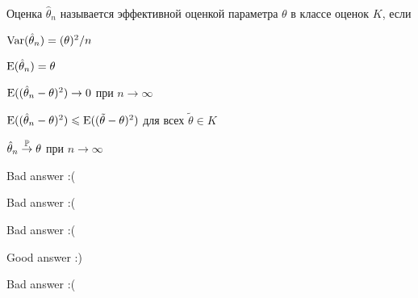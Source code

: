 
\begin{question}
Оценка \(\hat \theta_n\) называется эффективной оценкой параметра
\(\theta\) в классе оценок \(K\), если
\begin{answerlist}
  \item \(\Var(\hat \theta_n)=(\theta)^2/n\)
  \item \(\E(\hat \theta_n)=\theta\)
  \item \(\E((\hat \theta_n - \theta)^2) \stackrel{}{\to} 0\) при
\(n\stackrel{}{\to} \infty\)
  \item \(\E((\hat \theta_n - \theta)^2) \leq \E((\tilde \theta - \theta)^2)\)
для всех \(\tilde \theta \in K\)
  \item \(\hat \theta_n \stackrel{\P}{\to} \theta\) при
\(n\stackrel{}{\to} \infty\)
\end{answerlist}
\end{question}

\begin{solution}
\begin{answerlist}
  \item Bad answer :(
  \item Bad answer :(
  \item Bad answer :(
  \item Good answer :)
  \item Bad answer :(
\end{answerlist}
\end{solution}


